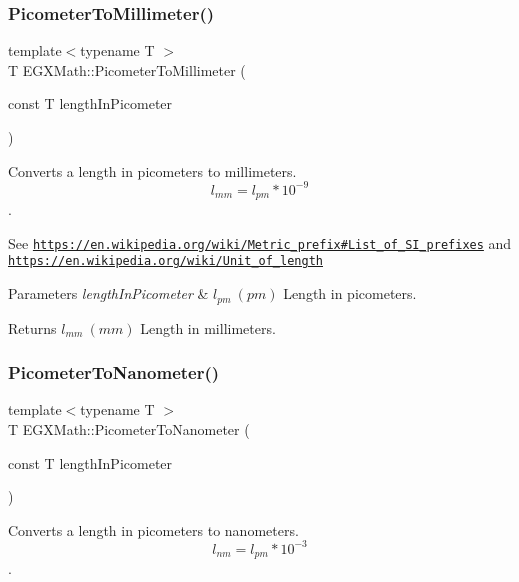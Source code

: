 \subsubsection{\texorpdfstring{Picometer\+To\+Millimeter()}{PicometerToMillimeter()}}
{\footnotesize\ttfamily template$<$typename T $>$ \\
T E\+G\+X\+Math\+::\+Picometer\+To\+Millimeter (\begin{DoxyParamCaption}\item[{const T}]{length\+In\+Picometer }\end{DoxyParamCaption})}



Converts a length in picometers to millimeters. \[ l_{mm}=l_{pm} * 10^{-9} \]. 

See \href{https://en.wikipedia.org/wiki/Metric_prefix#List_of_SI_prefixes}{\tt https\+://en.\+wikipedia.\+org/wiki/\+Metric\+\_\+prefix\#\+List\+\_\+of\+\_\+\+S\+I\+\_\+prefixes} and \href{https://en.wikipedia.org/wiki/Unit_of_length}{\tt https\+://en.\+wikipedia.\+org/wiki/\+Unit\+\_\+of\+\_\+length} 
\begin{DoxyParams}{Parameters}
{\em length\+In\+Picometer} & $ l_{pm}\ (pm)$ Length in picometers. \\
\hline
\end{DoxyParams}
\begin{DoxyReturn}{Returns}
$ l_{mm}\ (mm)$ Length in millimeters. 
\end{DoxyReturn}
\mbox{\label{group___e_g_x_math-_conversions-_length_conversions-_picometer-_s_i_gace426a434c0521d391fd15260e33d9f0}} 
\subsubsection{\texorpdfstring{Picometer\+To\+Nanometer()}{PicometerToNanometer()}}
{\footnotesize\ttfamily template$<$typename T $>$ \\
T E\+G\+X\+Math\+::\+Picometer\+To\+Nanometer (\begin{DoxyParamCaption}\item[{const T}]{length\+In\+Picometer }\end{DoxyParamCaption})}



Converts a length in picometers to nanometers. \[ l_{nm}=l_{pm} * 10^{-3} \]. 

